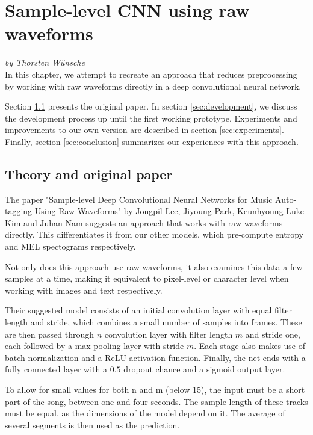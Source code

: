 \chapter{Sample-level CNN using raw waveforms}
\textit{by Thorsten Wünsche}\\

In this chapter, we attempt to recreate an approach that reduces preprocessing by working with raw waveforms directly in a deep convolutional neural network. 

Section \ref{sec:theory} presents the original paper. In section \ref{sec:development}, we discuss the development process up until the first working prototype. Experiments and improvements to our own version are described in section \ref{sec:experiments}. Finally, section \ref{sec:conclusion} summarizes our experiences with this approach.

\section{Theory and original paper}
\label{sec:theory}
The paper "Sample-level Deep Convolutional Neural Networks for Music Auto-tagging Using Raw Waveforms" \cite{DBLP:journals/corr/LeePKN17} by Jongpil Lee, Jiyoung Park, Keunhyoung Luke Kim and Juhan Nam suggests an approach that works with raw waveforms directly. This differentiates it from our other models, which pre-compute entropy and MEL spectograms respectively.

Not only does this approach use raw waveforms, it also examines this data a few samples at a time, making it equivalent to pixel-level or character level when working with images and text respectively. 

Their suggested model consists of an initial convolution layer with equal filter length and stride, which combines a small number of samples into frames. These are then passed through $n$ convolution layer with filter length $m$ and stride one, each followed by a max-pooling layer with stride $m$. Each stage also makes use of batch-normalization and a ReLU activation function. Finally, the net ends with a fully connected layer with a $0.5$ dropout chance and a sigmoid output layer.

To allow for small values for both n and m (below 15), the input must be a short part of the song, between one and four seconds. The sample length of these tracks must be equal, as the dimensions of the model depend on it. The average of several segments is then used as the prediction.

